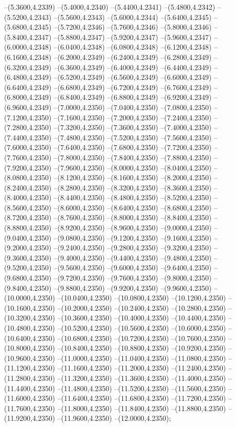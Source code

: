 {	--(5.3600,4.2339)
	--(5.4000,4.2340)
	--(5.4400,4.2341)
	--(5.4800,4.2342)
	--(5.5200,4.2343)
	--(5.5600,4.2343)
	--(5.6000,4.2344)
	--(5.6400,4.2345)
	--(5.6800,4.2345)
	--(5.7200,4.2346)
	--(5.7600,4.2346)
	--(5.8000,4.2346)
	--(5.8400,4.2347)
	--(5.8800,4.2347)
	--(5.9200,4.2347)
	--(5.9600,4.2347)
	--(6.0000,4.2348)
	--(6.0400,4.2348)
	--(6.0800,4.2348)
	--(6.1200,4.2348)
	--(6.1600,4.2348)
	--(6.2000,4.2349)
	--(6.2400,4.2349)
	--(6.2800,4.2349)
	--(6.3200,4.2349)
	--(6.3600,4.2349)
	--(6.4000,4.2349)
	--(6.4400,4.2349)
	--(6.4800,4.2349)
	--(6.5200,4.2349)
	--(6.5600,4.2349)
	--(6.6000,4.2349)
	--(6.6400,4.2349)
	--(6.6800,4.2349)
	--(6.7200,4.2349)
	--(6.7600,4.2349)
	--(6.8000,4.2349)
	--(6.8400,4.2349)
	--(6.8800,4.2349)
	--(6.9200,4.2349)
	--(6.9600,4.2349)
	--(7.0000,4.2350)
	--(7.0400,4.2350)
	--(7.0800,4.2350)
	--(7.1200,4.2350)
	--(7.1600,4.2350)
	--(7.2000,4.2350)
	--(7.2400,4.2350)
	--(7.2800,4.2350)
	--(7.3200,4.2350)
	--(7.3600,4.2350)
	--(7.4000,4.2350)
	--(7.4400,4.2350)
	--(7.4800,4.2350)
	--(7.5200,4.2350)
	--(7.5600,4.2350)
	--(7.6000,4.2350)
	--(7.6400,4.2350)
	--(7.6800,4.2350)
	--(7.7200,4.2350)
	--(7.7600,4.2350)
	--(7.8000,4.2350)
	--(7.8400,4.2350)
	--(7.8800,4.2350)
	--(7.9200,4.2350)
	--(7.9600,4.2350)
	--(8.0000,4.2350)
	--(8.0400,4.2350)
	--(8.0800,4.2350)
	--(8.1200,4.2350)
	--(8.1600,4.2350)
	--(8.2000,4.2350)
	--(8.2400,4.2350)
	--(8.2800,4.2350)
	--(8.3200,4.2350)
	--(8.3600,4.2350)
	--(8.4000,4.2350)
	--(8.4400,4.2350)
	--(8.4800,4.2350)
	--(8.5200,4.2350)
	--(8.5600,4.2350)
	--(8.6000,4.2350)
	--(8.6400,4.2350)
	--(8.6800,4.2350)
	--(8.7200,4.2350)
	--(8.7600,4.2350)
	--(8.8000,4.2350)
	--(8.8400,4.2350)
	--(8.8800,4.2350)
	--(8.9200,4.2350)
	--(8.9600,4.2350)
	--(9.0000,4.2350)
	--(9.0400,4.2350)
	--(9.0800,4.2350)
	--(9.1200,4.2350)
	--(9.1600,4.2350)
	--(9.2000,4.2350)
	--(9.2400,4.2350)
	--(9.2800,4.2350)
	--(9.3200,4.2350)
	--(9.3600,4.2350)
	--(9.4000,4.2350)
	--(9.4400,4.2350)
	--(9.4800,4.2350)
	--(9.5200,4.2350)
	--(9.5600,4.2350)
	--(9.6000,4.2350)
	--(9.6400,4.2350)
	--(9.6800,4.2350)
	--(9.7200,4.2350)
	--(9.7600,4.2350)
	--(9.8000,4.2350)
	--(9.8400,4.2350)
	--(9.8800,4.2350)
	--(9.9200,4.2350)
	--(9.9600,4.2350)
	--(10.0000,4.2350)
	--(10.0400,4.2350)
	--(10.0800,4.2350)
	--(10.1200,4.2350)
	--(10.1600,4.2350)
	--(10.2000,4.2350)
	--(10.2400,4.2350)
	--(10.2800,4.2350)
	--(10.3200,4.2350)
	--(10.3600,4.2350)
	--(10.4000,4.2350)
	--(10.4400,4.2350)
	--(10.4800,4.2350)
	--(10.5200,4.2350)
	--(10.5600,4.2350)
	--(10.6000,4.2350)
	--(10.6400,4.2350)
	--(10.6800,4.2350)
	--(10.7200,4.2350)
	--(10.7600,4.2350)
	--(10.8000,4.2350)
	--(10.8400,4.2350)
	--(10.8800,4.2350)
	--(10.9200,4.2350)
	--(10.9600,4.2350)
	--(11.0000,4.2350)
	--(11.0400,4.2350)
	--(11.0800,4.2350)
	--(11.1200,4.2350)
	--(11.1600,4.2350)
	--(11.2000,4.2350)
	--(11.2400,4.2350)
	--(11.2800,4.2350)
	--(11.3200,4.2350)
	--(11.3600,4.2350)
	--(11.4000,4.2350)
	--(11.4400,4.2350)
	--(11.4800,4.2350)
	--(11.5200,4.2350)
	--(11.5600,4.2350)
	--(11.6000,4.2350)
	--(11.6400,4.2350)
	--(11.6800,4.2350)
	--(11.7200,4.2350)
	--(11.7600,4.2350)
	--(11.8000,4.2350)
	--(11.8400,4.2350)
	--(11.8800,4.2350)
	--(11.9200,4.2350)
	--(11.9600,4.2350)
	--(12.0000,4.2350);
}
